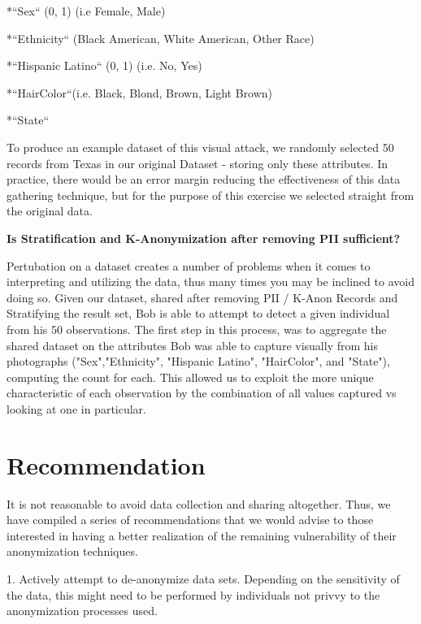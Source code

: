 \documentclass[10pt,journal,compsoc]{IEEEtran}
\begin{document}
		*``Sex`` (0, 1) (i.e Female, Male)
		
		*``Ethnicity`` (Black American, White American, Other Race)
		
		*``Hispanic Latino`` (0, 1) (i.e. No, Yes)
		
		*``HairColor``(i.e. Black, Blond, Brown, Light Brown)
		
		*``State``
		
To produce an example dataset of this visual attack, we randomly selected 50 records from Texas in our original Dataset - storing only these attributes. In practice, there would be an error margin reducing the effectiveness of this data gathering technique, but for the purpose of this exercise we selected straight from the original data.\linebreak


\noindent \textbf {Is Stratification and K-Anonymization after removing PII sufficient?}

Pertubation on a dataset creates a number of problems when it comes to interpreting and utilizing the data, thus many times you may be inclined to avoid doing so. Given our dataset, shared after removing PII / K-Anon Records and Stratifying the result set, Bob is able to attempt to detect a given individual from his 50 observations.
The first step in this process, was to aggregate the shared dataset on the attributes Bob was able to capture visually from his photographs ("Sex","Ethnicity", "Hispanic Latino", "HairColor", and "State"), computing the count for each. This allowed us to exploit the more unique characteristic of each observation by the combination of all values captured vs looking at one in particular.

	

\section{Recommendation}

	It is not reasonable to avoid data collection and sharing altogether.  Thus, we have compiled a series of recommendations that we would advise to those interested in having a better realization of the remaining vulnerability of their anonymization techniques.\linebreak
	
1. Actively attempt to de-anonymize data sets.  Depending on the sensitivity of the data, this might need to be performed by individuals not privvy to the anonymization processes used.\linebreak
\end{document}
